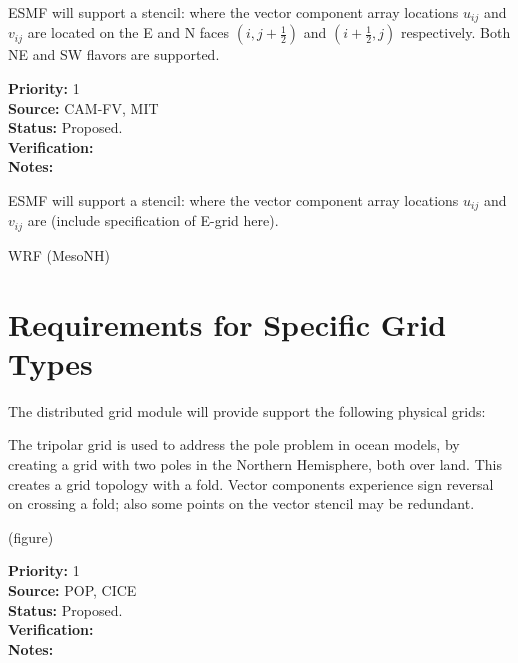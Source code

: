\sreq{\dgrid}

ESMF will support a \dgrid stencil: where the vector component array
locations $u_{ij}$ and $v_{ij}$ are located on the E and N faces
$(i,j+\frac12)$ and $(i+\frac12,j)$ respectively. Both NE and SW
flavors are supported.

\begin{reqlist}
{\bf Priority:} 1 \\ 
{\bf Source:} CAM-FV, MIT \\
{\bf Status:} Proposed. \\
{\bf Verification:} \\
{\bf Notes:}
\end{reqlist}

\sreq{\egrid}

ESMF will support a \dgrid stencil: where the vector component array
locations $u_{ij}$ and $v_{ij}$ are (include specification of E-grid here).

\begin{reqlist}
\item[Priority]  
\item[Source]
WRF (MesoNH)
\item[Status]
\item[Verification]
\item[Notes]
\end{reqlist}

\part{Requirements for Specific Grid Types} \label{DG:gridtypes}

The distributed grid module will provide support the following 
physical grids:


The tripolar grid \cite{ref:m1996} is used to address the pole problem
in ocean models, by creating a grid with two poles in the Northern
Hemisphere, both over land. This creates a grid topology with a
fold. Vector components experience sign reversal on crossing a fold;
also some points on the vector stencil may be redundant.

(figure)

\begin{reqlist}
{\bf Priority:} 1 \\ 
{\bf Source:} POP, CICE \\
{\bf Status:} Proposed. \\
{\bf Verification:} \\
{\bf Notes:}
\end{reqlist}

